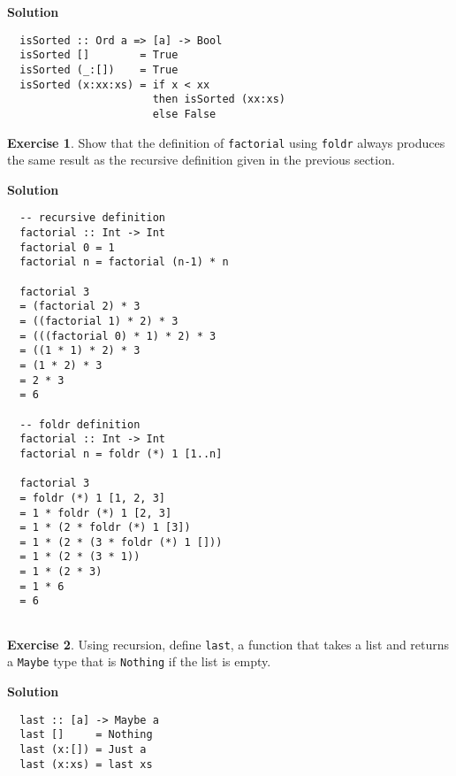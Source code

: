 \documentclass[11pt,a4paper]{article}
\theoremstyle{definition}
\newtheorem{exr}{Exercise}
\begin{document}
\textbf{Solution}
\begin{lstlisting}
  isSorted :: Ord a => [a] -> Bool
  isSorted []        = True
  isSorted (_:[])    = True
  isSorted (x:xx:xs) = if x < xx
                       then isSorted (xx:xs)
                       else False
\end{lstlisting}


\vspace{5mm}

\begin{exr}
  Show that the definition of \texttt{factorial} using \texttt{foldr} always 
  produces the same result as the recursive definition given in the previous 
  section.
\end{exr}

\textbf{Solution}
\begin{lstlisting}
  -- recursive definition
  factorial :: Int -> Int
  factorial 0 = 1
  factorial n = factorial (n-1) * n

  factorial 3
  = (factorial 2) * 3
  = ((factorial 1) * 2) * 3
  = (((factorial 0) * 1) * 2) * 3
  = ((1 * 1) * 2) * 3
  = (1 * 2) * 3
  = 2 * 3
  = 6

  -- foldr definition
  factorial :: Int -> Int
  factorial n = foldr (*) 1 [1..n]

  factorial 3
  = foldr (*) 1 [1, 2, 3]
  = 1 * foldr (*) 1 [2, 3]
  = 1 * (2 * foldr (*) 1 [3])
  = 1 * (2 * (3 * foldr (*) 1 []))
  = 1 * (2 * (3 * 1))
  = 1 * (2 * 3)
  = 1 * 6
  = 6
  

\end{lstlisting}


\vspace{5mm}

\begin{exr}
  Using recursion, define \texttt{last}, a function that takes a list and returns 
  a \texttt{Maybe} type that is \texttt{Nothing} if the list is empty.
\end{exr}

\textbf{Solution}
\begin{lstlisting}
  last :: [a] -> Maybe a
  last []     = Nothing
  last (x:[]) = Just a
  last (x:xs) = last xs
\end{lstlisting}


\vspace{5mm}
\end{document}
